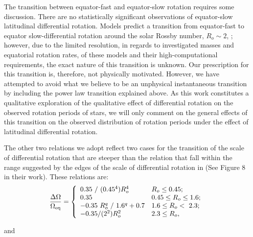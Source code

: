 The transition between equator-fast and equator-slow rotation requires some discussion.
There are no statistically significant observations of equator-slow latitudinal differential rotation.
Models predict a transition from equator-fast to equator slow-differential rotation around the solar Rossby number, $R_o \sim 2$, \citep{brun_powering_2022}; however, due to the limited resolution, in regards to investigated masses and equatorial rotation rates, of these models and their high-computational requirements, the exact nature of this transition is unknown.
Our prescription for this transition is, therefore, not physically motivated.
However, we have attempted to avoid what we believe to be an unphysical instantaneous transition by including the power law transition explained above.
As this work constitutes a qualitative exploration of the qualitative effect of differential rotation on the observed rotation periods of stars, we will only comment on the general effects of this transition on the observed distribution of rotation periods under the effect of latitudinal differential rotation.

The other two relations we adopt reflect two cases for the transition of the scale of differential rotation that are steeper than the \citet{saar_starspots_2011} relation that fall within the range suggested by the edges of the scale of differential rotation in \citet{brun_powering_2022} (See Figure 8 in their work).
These relations are:
\begin{equation}
\label{eq:rot_pow4}
{\centering
\frac{\Delta\Omega}{\Omega_{\rm{eq}}} = \left\{
\begin{array}{ll}
 0.35 \ / \ (0.45^4) R_o^4& R_o\leq 0.45; \\
 0.35 & 0.45\leq R_o\leq 1.6; \\
 -0.35 \ R_o^q \ / \ 1.6^q + 0.7 & 1.6 \leq R_o < \ 2.3;\\
 -0.35/(2^2) R_o^2& 2.3\leq R_o, \\
\end{array} 
\right.}
\end{equation}

and

